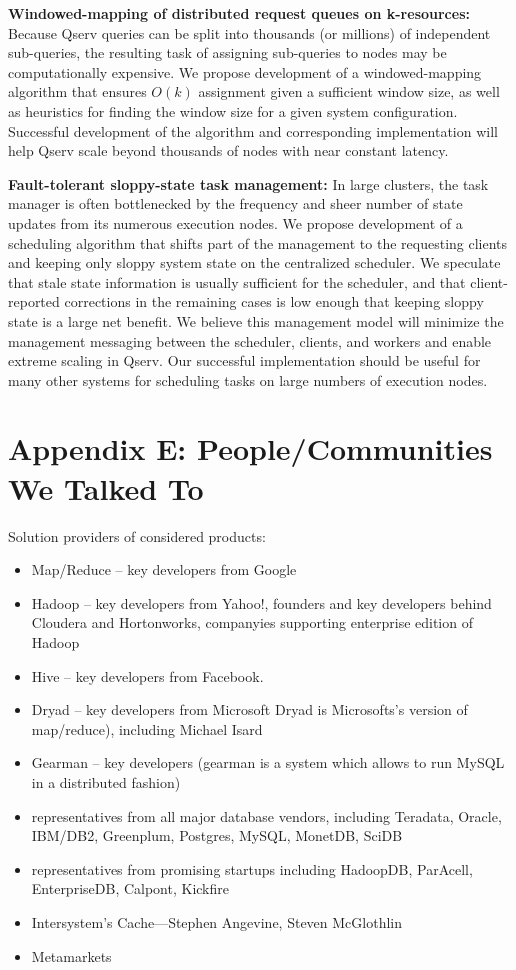 \documentclass[DM,lsstdraft,toc]{lsstdoc}
\begin{document}
\textbf{Windowed-mapping of distributed request queues on k-resources:}
Because Qserv queries can be split into thousands (or millions) of
independent sub-queries, the resulting task of assigning sub-queries to
nodes may be computationally expensive. We propose development of a
windowed-mapping algorithm that ensures \(O(k)\) assignment given a
sufficient window size, as well as heuristics for finding the window
size for a given system configuration. Successful development of the
algorithm and corresponding implementation will help Qserv scale beyond
thousands of nodes with near constant latency.

\textbf{Fault-tolerant sloppy-state task management:} In large clusters,
the task manager is often bottlenecked by the frequency and sheer number
of state updates from its numerous execution nodes. We propose
development of a scheduling algorithm that shifts part of the management
to the requesting clients and keeping only sloppy system state on the
centralized scheduler. We speculate that stale state information is
usually sufficient for the scheduler, and that client-reported
corrections in the remaining cases is low enough that keeping sloppy
state is a large net benefit. We believe this management model will
minimize the management messaging between the scheduler, clients, and
workers and enable extreme scaling in Qserv. Our successful
implementation should be useful for many other systems for scheduling
tasks on large numbers of execution nodes.

\section{Appendix E: People/Communities We Talked
To}\label{appendix-e-peoplecommunities-we-talked-to}

Solution providers of considered products:

\begin{itemize}
\item
  Map/Reduce -- key developers from Google
\item
  Hadoop -- key developers from Yahoo!, founders and key developers
  behind Cloudera and Hortonworks,
  companyies supporting enterprise edition of Hadoop
\item
  Hive -- key developers from
  Facebook.
\item
  Dryad --
  key developers from Microsoft
  Dryad is
  Microsofts's version of map/reduce), including Michael Isard
\item
  Gearman -- key developers (gearman is a
  system which allows to run MySQL in a distributed fashion)
\item
  representatives from all major database vendors, including Teradata,
  Oracle, IBM/DB2, Greenplum, Postgres, MySQL, MonetDB, SciDB
\item
  representatives from promising startups including HadoopDB, ParAcell,
  EnterpriseDB, Calpont, Kickfire
\item
  Intersystem's Cache---Stephen Angevine, Steven McGlothlin
\item
  Metamarkets
\end{itemize}
\end{document}
